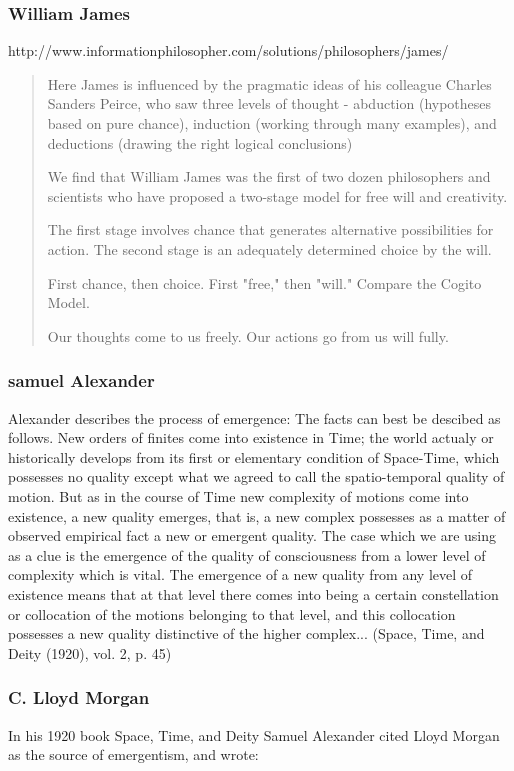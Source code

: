 \documentclass[a4paper]{Thesis}
\begin{document}
	\subsubsection{William James}
	http://www.informationphilosopher.com/solutions/philosophers/james/
	\begin{quotation}
		Here James is influenced by the pragmatic ideas of his colleague Charles Sanders Peirce, who saw three levels of thought - abduction (hypotheses based on pure chance), induction (working through many examples), and deductions (drawing the right logical conclusions)
		
		We find that William James was the first of two dozen philosophers and scientists who have proposed a two-stage model for free will and creativity.
		
		The first stage involves chance that generates alternative possibilities for action. 
		The second stage is an adequately determined choice by the will.
		
		First chance, then choice. First "free," then "will." 
		Compare the Cogito Model.
		
		Our thoughts come to us freely. Our actions go from us will fully.
	\end{quotation}
	
	
	\subsubsection{samuel Alexander}
	
	Alexander describes the process of emergence:
	The facts can best be descibed as follows. New orders of finites come into existence in Time; the world actualy or historically develops from its first or elementary condition of Space-Time, which possesses no quality except what we agreed to call the spatio-temporal quality of motion. But as in the course of Time new complexity of motions come into existence, a new quality emerges, that is, a new complex possesses as a matter of observed empirical fact a new or emergent quality. The case which we are using as a clue is the emergence of the quality of consciousness from a lower level of complexity which is vital. The emergence of a new quality from any level of existence means that at that level there comes into being a certain constellation or collocation of the motions belonging to that level, and this collocation possesses a new quality distinctive of the higher complex...
	(Space, Time, and Deity (1920), vol. 2, p. 45)
	
	\subsubsection{C. Lloyd Morgan}
	In his 1920 book Space, Time, and Deity Samuel Alexander cited Lloyd Morgan as the source of emergentism, and wrote:
	
\end{document}
